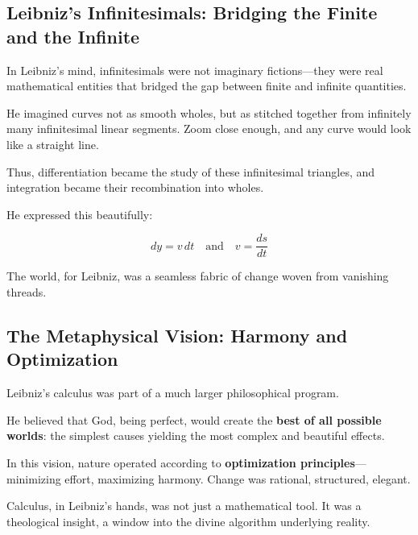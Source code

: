 \subsection{Leibniz’s Infinitesimals: Bridging the Finite and the Infinite}

In Leibniz’s mind, infinitesimals were not imaginary fictions—they were real mathematical entities that bridged the gap between finite and infinite quantities.

He imagined curves not as smooth wholes, but as stitched together from infinitely many infinitesimal linear segments. Zoom close enough, and any curve would look like a straight line.

Thus, differentiation became the study of these infinitesimal triangles, and integration became their recombination into wholes.

He expressed this beautifully:

\[
dy = v\,dt
\quad \text{and} \quad
v = \frac{ds}{dt}
\]

The world, for Leibniz, was a seamless fabric of change woven from vanishing threads.

\subsection{The Metaphysical Vision: Harmony and Optimization}

Leibniz's calculus was part of a much larger philosophical program.

He believed that God, being perfect, would create the \textbf{best of all possible worlds}: the simplest causes yielding the most complex and beautiful effects.

In this vision, nature operated according to \textbf{optimization principles}—minimizing effort, maximizing harmony. Change was rational, structured, elegant.

Calculus, in Leibniz's hands, was not just a mathematical tool. It was a theological insight, a window into the divine algorithm underlying reality.

